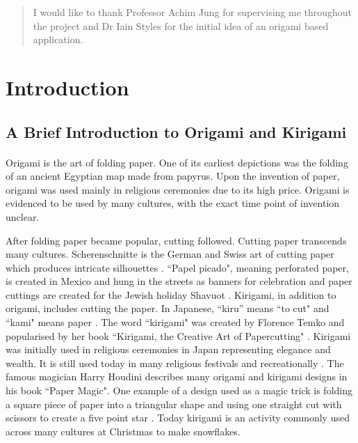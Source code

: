 \documentclass[11pt]{article}
\begin{document}
\vspace{50pt}
\renewcommand{\abstractname}{Acknowledgements}
\begin{abstract}
    I would like to thank Professor Achim Jung for supervising me throughout the project and Dr Iain Styles for the initial idea of an origami based application. 
\end{abstract}

\newpage

\section{Introduction}

        \subsection{A Brief Introduction to Origami and Kirigami}
        
            \paragraph{}
            Origami is the art of folding paper. One of its earliest depictions was the folding of an ancient Egyptian map made from papyrus. Upon the invention of paper, origami was used mainly in religious ceremonies due to its high price. Origami is evidenced to be used by many cultures, with the exact time point of invention unclear.\cite{origamiBible}
            
            After folding paper became popular, cutting followed. Cutting paper transcends many cultures. Scherenschnitte is the German and Swiss art of cutting paper which produces intricate silhouettes \cite{Scherenschnitt}. ``Papel picado", meaning perforated paper, is created in Mexico and hung in the streets as banners for celebration \cite{GlobalPaperCutting} and paper cuttings are created for the Jewish holiday Shavuot \cite{CJNews}. Kirigami, in addition to origami, includes cutting the paper. In Japanese, ``kiru'' means ``to cut" \cite{Temko2004kirigami} and ``kami" means paper \cite{WordHippo}. The word ``kirigami" was created by Florence Temko and popularised by her book ``Kirigami, the Creative Art of Papercutting" \cite{OrigamiResourceCenter}. Kirigami was initially used in religious ceremonies in Japan representing elegance and wealth. It is still used today in many religious festivals and recreationally \cite{kyuhoshiInfo}. The famous magician Harry Houdini describes many origami and kirigami designs in his book ``Paper Magic". One example of a design used as a magic trick is folding a square piece of paper into a triangular shape and using one straight cut with scissors to create a five point star \cite{PaperMagic}. Today kirigami is an activity commonly used across many cultures at Christmas to make snowflakes.
            
\end{document}
